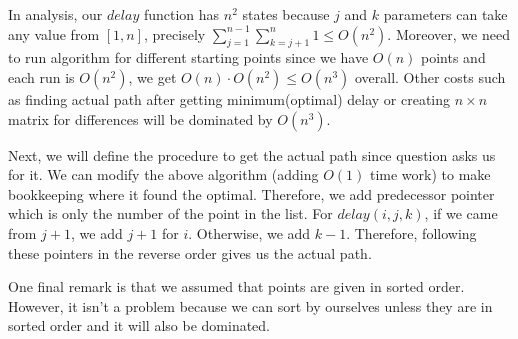 In analysis, our $delay$ function has $n^2$ states because $j$ and $k$ parameters can take any value from $[1, n]$, precisely $\sum_{j=1}^{n-1}{\sum_{k=j+1}^{n}{1}} \leq O(n^2)$. Moreover, we need to run algorithm for different starting points since we have $O(n)$ points and each run is $O(n^2)$, we get $O(n) \cdot O(n^2) \leq O(n^3)$ overall. Other costs such as finding actual path after getting minimum(optimal) delay or creating $n \times n$ matrix for differences will be dominated by $O(n^3)$.

Next, we will define the procedure to get the actual path since question asks us for it. We can modify the above algorithm (adding $O(1)$ time work) to make bookkeeping where it found the optimal. Therefore, we add predecessor pointer which is only the number of the point in the list. For $delay(i, j, k)$, if we came from $j+1$, we add $j+1$ for $i$. Otherwise, we add $k-1$. Therefore, following these pointers in the reverse order gives us the actual path.

One final remark is that we assumed that points are given in sorted order. However, it isn't a problem because we can sort by ourselves unless they are in sorted order and it will also be dominated.